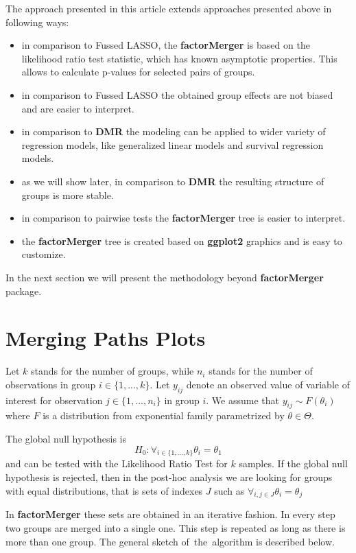 \documentclass[12pt]{article}
\newcommand{\factorMerger}{\textbf{factorMerger }}
\begin{document}
The approach presented in this article extends approaches presented above in following ways:
\begin{itemize}
\item in comparison to Fussed LASSO, the \factorMerger is based on the likelihood ratio test statistic, which has known asymptotic properties. This allows to calculate p-values for selected pairs of groups.
\item in comparison to Fussed LASSO the obtained group effects are not biased and are easier to interpret. 
\item in comparison to \textbf{DMR} the modeling can be applied to wider variety of regression models, like generalized linear models and survival regression models. 
\item as we will show later, in comparison to \textbf{DMR} the resulting structure of groups is more stable. 
\item in comparison to pairwise tests the \factorMerger tree is easier to interpret.
\item the \factorMerger tree is created based on 
\textbf{ggplot2} \cite{ggplot2} graphics and is easy to customize.
\end{itemize}

In the next section we will present the methodology beyond \factorMerger package.

\section{Merging Paths Plots}
\label{sec:meth}

Let $k$ stands for the number of groups, while $n_i$ stands for the number of observations in group $i \in \{1, ..., k\}$.
Let $y_{ij}$ denote an observed value of variable of interest for observation $j \in \{1, ..., n_i\}$ in group $i$. We assume that $y_{ij} \sim F(\theta_i)$ where $F$ is a distribution from exponential family parametrized by $\theta \in \Theta$.

The global null hypothesis is 
$$
H_0: \forall_{i \in \{1, ..., k\}} \theta_i = \theta_1
$$
and can be tested with the Likelihood Ratio Test for $k$ samples. If the global null hypothesis is rejected, then in the post-hoc analysis we are looking for groups with equal distributions, that is sets of indexes $J$ such as 
$\forall_{i,j \in J} \theta_i = \theta_j$

In \factorMerger these sets are obtained in an iterative fashion. In every step two groups are merged into a single one. This step is repeated as long as there is more than one group.
The general sketch of~the~algorithm is described below.
\end{document}
